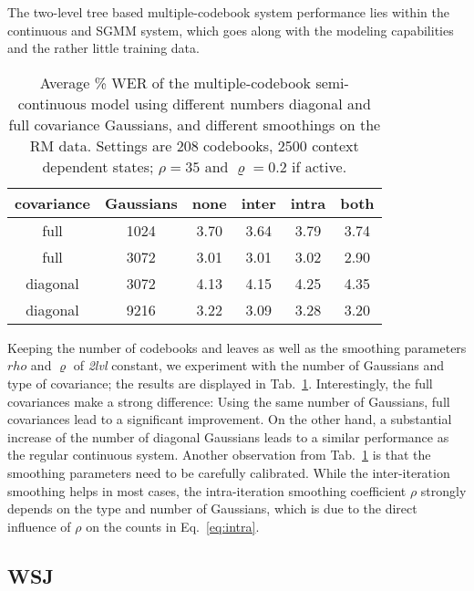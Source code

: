 \documentclass{article}
\begin{document}
The two-level tree based multiple-codebook system performance lies within the 
continuous and SGMM system, which goes along with the modeling capabilities 
and the rather little training data. 


\begin{table}%
\begin{center}
\begin{tabular}{|c|c||c|c|c|c|}
\hline
covariance & Gaussians & none & inter & intra & both \\ \hline\hline
full       &      1024 & 3.70 & 3.64 & 3.79 & 3.74 \\ \hline
full       &      3072 & 3.01 & 3.01 & 3.02 & 2.90 \\ \hline\hline
diagonal   &      3072 & 4.13 & 4.15 & 4.25 & 4.35 \\ \hline
diagonal   &      9216 & 3.22 & 3.09 & 3.28 & 3.20 \\ \hline
\end{tabular}
\end{center}
\caption{\label{tab:rm_diagfull}
Average \% WER of the multiple-codebook semi-continuous model using different 
numbers diagonal and full covariance Gaussians, and different smoothings 
on the RM data. 
Settings are 208 codebooks, 2500 context dependent states; $\rho = 35$ 
and $\varrho = 0.2$ if active.
}
\end{table}

Keeping the number of codebooks and leaves as well as the smoothing parameters
$rho$ and $\varrho$ of {\em 2lvl} constant, we experiment with the number of
Gaussians and type of covariance; the results are displayed in 
Tab.~\ref{tab:rm_diagfull}.
Interestingly, the full covariances make a strong difference: Using the same
number of Gaussians, full covariances lead to a significant improvement.
On the other hand, a substantial increase of the number of diagonal Gaussians 
leads to a similar performance as the regular continuous system.
%
Another observation from Tab.~\ref{tab:rm_diagfull} is that the smoothing
parameters need to be carefully calibrated. While the inter-iteration smoothing
helps in most cases, the intra-iteration smoothing coefficient $\rho$ strongly
depends on the type and number of Gaussians, which is due to the direct influence
of $\rho$ on the counts in Eq.~\ref{eq:intra}.

\subsection{WSJ}
\end{document}
